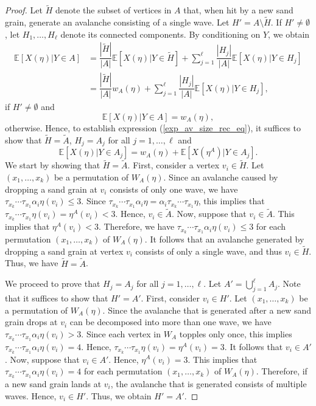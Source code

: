 \documentclass{article}
\begin{document}
\begin{proof}
    Let $\tilde{H}$ denote the subset of vertices in $A$ that, when hit by a new sand grain, generate an avalanche consisting of a single wave. Let $H' = A \setminus \tilde{H}$. If $H' \neq \emptyset$, let $H_1, \ldots, H_{\ell}$ denote its connected components. By conditioning on $Y$, we obtain
    \begin{align*}
        \mathbb{E}[X(\eta)|Y \in A] &= \dfrac{|\tilde{H}|}{|A|} \mathbb{E}[X(\eta)|Y \in \tilde{H}]  + \sum\limits_{j=1}^{\ell} \dfrac{|H_j|}{|A|} \mathbb{E}[X(\eta)|Y \in H_j] \\
        &= \dfrac{|\tilde{H}|}{|A|} w_A(\eta) + \sum\limits_{j=1}^{\ell} \dfrac{|H_j|}{|A|}\mathbb{E}[X(\eta)|Y \in H_j],
    \end{align*}
    if $H' \neq \emptyset$ and
    \begin{equation*}
        \mathbb{E}[X(\eta)|Y \in A] = w_A(\eta),
    \end{equation*}
    otherwise. Hence, to establish expression (\ref{exp_av_size_rec_eq}), it suffices to show that $\tilde{H} = \tilde{A}$, $H_j = A_j$ for all $j = 1, \ldots, \ell$ and
    \begin{equation}\label{exp_av_size_rec_help}
        \mathbb{E}[X(\eta)|Y \in A_j] = w_A(\eta) + \mathbb{E}[X(\eta^A)|Y \in A_j].
    \end{equation}
    We start by showing that $\tilde{H} = \tilde{A}$. First, consider a vertex $v_i \in \tilde{H}$. Let $(x_1, \ldots, x_k)$ be a permutation of $W_A(\eta)$. Since an avalanche caused by dropping a sand grain at $v_i$ consists of only one wave, we have $\tau_{x_k} \cdots \tau_{x_1} \alpha_i \eta(v_i) \leq 3$. Since $\tau_{x_k} \cdots \tau_{x_1} \alpha_i \eta = \alpha_i \tau_{x_k} \cdots \tau_{x_1} \eta$, this implies that $\tau_{x_k} \cdots \tau_{x_1} \eta(v_i) = \eta^A(v_i) < 3$. Hence, $v_i \in \tilde{A}$. Now, suppose that $v_i \in \tilde{A}$. This implies that $\eta^A(v_i) < 3$. Therefore, we have $\tau_{x_k} \cdots \tau_{x_1} \alpha_i \eta(v_i) \leq 3$ for each permutation $(x_1, \ldots, x_k)$ of $W_A(\eta)$. It follows that an avalanche generated by dropping a sand grain at vertex $v_i$ consists of only a single wave, and thus $v_i \in \tilde{H}$. Thus, we have $\tilde{H} = \tilde{A}$.

    We proceed to prove that $H_j = A_j$ for all $j = 1, \ldots, \ell$. Let $A' = \bigcup_{j = 1}^{\ell} A_j$. Note that it suffices to show that $H' = A'$. First, consider $v_i \in H'$. Let $(x_1, \ldots, x_k)$ be a permutation of $W_A(\eta)$. Since the avalanche that is generated after a new sand grain drops at $v_i$ can be decomposed into more than one wave, we have $\tau_{x_k} \cdots \tau_{x_1} \alpha_i \eta(v_i) > 3$. Since each vertex in $W_A$ topples only once, this implies $\tau_{x_k} \cdots \tau_{x_1} \alpha_i \eta (v_i) = 4$. Hence, $\tau_{x_k} \cdots \tau_{x_1} \eta(v_i) = \eta^A(v_i) = 3$. It follows that $v_i \in A'$. Now, suppose that $v_i \in A'$. Hence, $\eta^A(v_i) = 3$. This implies that $\tau_{x_k} \cdots \tau_{x_1} \alpha_i \eta (v_i) = 4$ for each permutation $(x_1, \ldots, x_k)$ of $W_A(\eta)$. Therefore, if a new sand grain lands at $v_i$, the avalanche that is generated consists of multiple waves. Hence, $v_i \in H'$. Thus, we obtain $H' = A'$. 


\end{proof}
\end{document}
